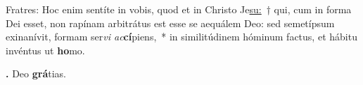 
Fratres: Hoc enim sentíte in vobis, quod et in Christo Je\underline{su:}~† qui, cum in forma Dei esset, non rapínam arbitrátus est esse se aequálem Deo: sed semetípsum exinanívit, formam ser\textit{vi ac}\textbf{cí}piens,~* in similitúdinem hóminum factus, et hábitu invéntus ut \textbf{ho}mo.

\textbf{\Rbar.} Deo \textbf{grá}tias.

